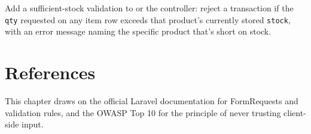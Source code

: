 \begin{challengebox}
Add a sufficient-stock validation to 
or the controller: reject a transaction if the \texttt{qty} requested
on any item row exceeds that product's currently stored \texttt{stock},
with an error message naming the specific product that's short on
stock.
\end{challengebox}

\section{References}

This chapter draws on the official Laravel documentation
\cite{laraveldocs} for FormRequests and validation rules, and the OWASP
Top 10 \cite{owasptop10} for the principle of never trusting
client-side input.
